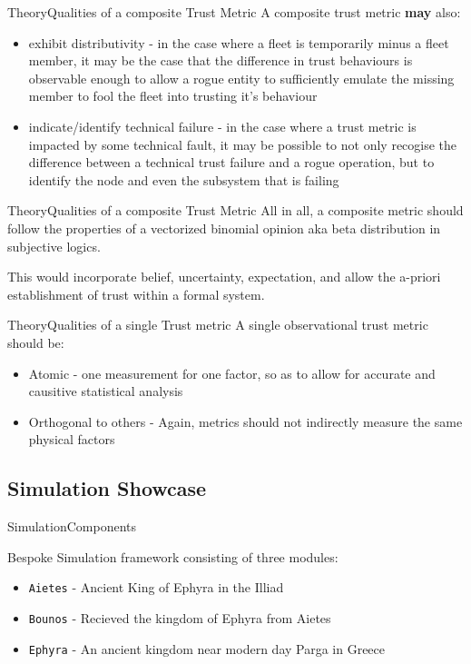 \documentclass[10pt]{beamer}
\begin{document}
\begin{frame}{Theory}{Qualities of a composite Trust Metric}
  A composite trust metric {\bf may} also:
  \begin{itemize}
    \item exhibit distributivity - in the case where a fleet is temporarily minus a fleet member, it may be the case that the difference in trust behaviours is observable enough to allow a rogue entity to sufficiently emulate the missing member to fool the fleet into trusting it's behaviour
    \item indicate/identify technical failure - in the case where a trust metric is impacted by some technical fault, it may be possible to not only recogise the difference between a technical trust failure and a rogue operation, but to identify the node and even the subsystem that is failing
  \end{itemize}
\end{frame}

\begin{frame}{Theory}{Qualities of a composite Trust Metric}
  All in all, a composite metric should follow the properties of a vectorized binomial opinion aka beta distribution in subjective logics.
  
  This would incorporate belief, uncertainty, expectation, and allow the a-priori establishment of trust within a formal system.
\end{frame}

\begin{frame}{Theory}{Qualities of a single Trust metric}
  A single observational trust metric should be:
  \begin{itemize}
    \item Atomic - one measurement for one factor, so as to allow for accurate and causitive statistical analysis
    \item Orthogonal to others - Again, metrics should not indirectly measure the same physical factors
  \end{itemize}
\end{frame}

\subsection{Simulation Showcase}

\begin{frame}{Simulation}{Components}

  Bespoke Simulation framework consisting of three modules:
  \begin{itemize}
  \item
    \texttt{Aietes} - Ancient King of Ephyra in the Illiad
  \item
    \texttt{Bounos} - Recieved the kingdom of Ephyra from Aietes
  \item
    \texttt{Ephyra} - An ancient kingdom near modern day Parga in Greece
  \end{itemize}
\end{frame}
\end{document}
